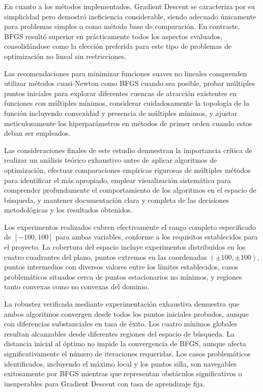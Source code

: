 \documentclass[12pt,a4paper]{article}
\begin{document}
En cuanto a los métodos implementados, Gradient Descent se caracteriza por su simplicidad pero demostró ineficiencia considerable, siendo adecuado únicamente para problemas simples o como método base de comparación. En contraste, BFGS resultó superior en prácticamente todos los aspectos evaluados, consolidándose como la elección preferida para este tipo de problemas de optimización no lineal sin restricciones.

Las recomendaciones para minimizar funciones suaves no lineales comprenden utilizar métodos cuasi-Newton como BFGS cuando sea posible, probar múltiples puntos iniciales para explorar diferentes cuencas de atracción existentes en funciones con múltiples mínimos, considerar cuidadosamente la topología de la función incluyendo convexidad y presencia de múltiples mínimos, y ajustar meticulosamente los hiperparámetros en métodos de primer orden cuando estos deban ser empleados.

Las consideraciones finales de este estudio demuestran la importancia crítica de realizar un análisis teórico exhaustivo antes de aplicar algoritmos de optimización, efectuar comparaciones empíricas rigurosas de múltiples métodos para identificar el más apropiado, emplear visualización sistemática para comprender profundamente el comportamiento de los algoritmos en el espacio de búsqueda, y mantener documentación clara y completa de las decisiones metodológicas y los resultados obtenidos.

Los experimentos realizados cubren efectivamente el rango completo especificado de $[-100, 100]$ para ambas variables, conforme a los requisitos establecidos para el proyecto. La cobertura del espacio incluye experimentos distribuidos en los cuatro cuadrantes del plano, puntos extremos en las coordenadas $(\pm100, \pm100)$, puntos intermedios con diversos valores entre los límites establecidos, casos problemáticos situados cerca de puntos estacionarios no mínimos, y regiones tanto convexas como no convexas del dominio.

La robustez verificada mediante experimentación exhaustiva demuestra que ambos algoritmos convergen desde todos los puntos iniciales probados, aunque con diferencias substanciales en tasa de éxito. Los cuatro mínimos globales resultan alcanzables desde diferentes regiones del espacio de búsqueda. La distancia inicial al óptimo no impide la convergencia de BFGS, aunque afecta significativamente el número de iteraciones requeridas. Los casos problemáticos identificados, incluyendo el máximo local y los puntos silla, son navegables exitosamente por BFGS mientras que representan obstáculos significativos o insuperables para Gradient Descent con tasa de aprendizaje fija.
\end{document}
